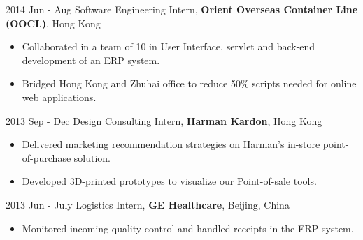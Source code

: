 2014 Jun - Aug \hspace{10mm} 
Software Engineering Intern, \textbf{Orient Overseas Container Line (OOCL)}, Hong Kong
\vspace{-1mm}
\begin{itemize}[noitemsep,itemsep=0pt,topsep=0pt,leftmargin=38mm]
    \item Collaborated in a team of 10 in User Interface, servlet and back-end development of an ERP system.
    \item Bridged Hong Kong and Zhuhai office to reduce 50\% scripts needed for online web applications.
\end{itemize}

2013 Sep - Dec \hspace{9mm} 
Design Consulting Intern, \textbf{Harman Kardon}, Hong Kong
\vspace{-1mm}
\begin{itemize}[noitemsep,itemsep=0pt,topsep=0pt,leftmargin=38mm]
    \item Delivered marketing recommendation strategies on Harman's in-store point-of-purchase solution.
    \item Developed 3D-printed prototypes to visualize our Point-of-sale tools.
\end{itemize}

2013 Jun - July \hspace{10mm} 
Logistics Intern, \textbf{GE Healthcare}, Beijing, China
\vspace{-1mm}
\begin{itemize}[noitemsep,itemsep=0pt,topsep=0pt,leftmargin=38mm]
    \item Monitored incoming quality control and handled receipts in the ERP system.
\end{itemize}
